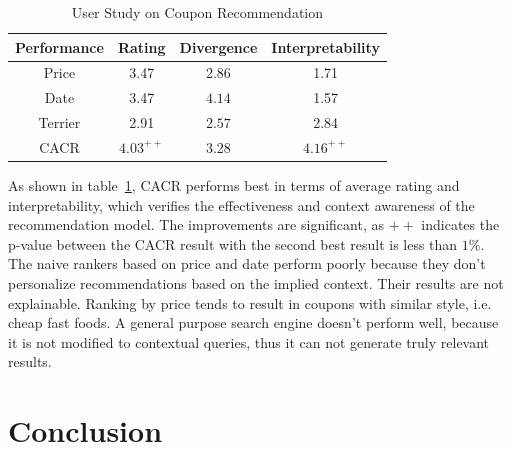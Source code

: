 \documentclass[preprint,12pt]{elsarticle}
\begin{document}
\begin{table}\label{tab:us}
\centering
\footnotesize
\caption{User Study on Coupon Recommendation}
\begin{tabular}{|c|c|c|c|}
  \hline
  Performance & Rating & Divergence & Interpretability \\\hline\hline
  Price & 3.47 & 2.86 & 1.71 \\
  Date & 3.47 & $\mathbf{4.14}$ & 1.57 \\
  Terrier & 2.91 & $2.57$ & 2.84 \\
  CACR & $\mathbf{4.03}^{++}$ & 3.28 & $\mathbf{4.16}^{++}$ \\
  \hline
\end{tabular}
\end{table}

As shown in table~\ref{tab:us}, CACR performs best in terms of average rating and interpretability, which verifies the effectiveness and context awareness of the recommendation model. The improvements are significant, as $++$ indicates the p-value between the CACR result with the second best result is less than $1\%$. The naive rankers based on price and date perform poorly because they don't personalize recommendations based on the implied context. Their results are not explainable. Ranking by price tends to result in coupons with similar style, i.e. cheap fast foods. A general purpose search engine doesn't perform well, because it is not modified to contextual queries, thus it can not generate truly relevant results.


\section{Conclusion}~\label{sec:con}
\end{document}
